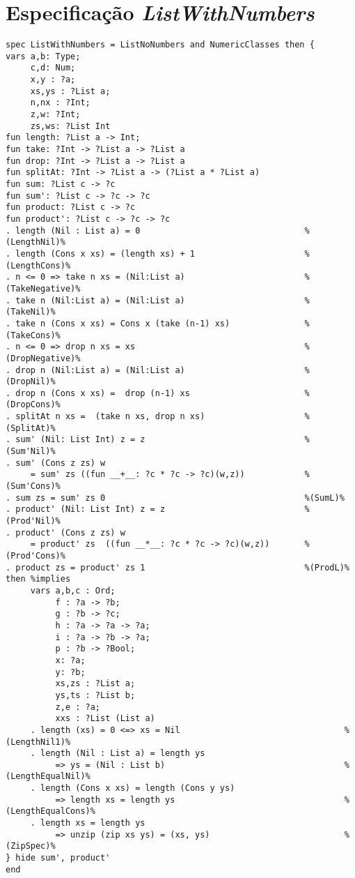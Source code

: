 \section{Especificação \textit{ListWithNumbers}}
\label{appendix:lazySpec:listWithNumbers}
\begin{Verbatim}
spec ListWithNumbers = ListNoNumbers and NumericClasses then {
vars a,b: Type;
     c,d: Num;
     x,y : ?a;
     xs,ys : ?List a;
     n,nx : ?Int;
     z,w: ?Int;
     zs,ws: ?List Int
fun length: ?List a -> Int;
fun take: ?Int -> ?List a -> ?List a
fun drop: ?Int -> ?List a -> ?List a
fun splitAt: ?Int -> ?List a -> (?List a * ?List a)
fun sum: ?List c -> ?c
fun sum': ?List c -> ?c -> ?c
fun product: ?List c -> ?c
fun product': ?List c -> ?c -> ?c
. length (Nil : List a) = 0                                 %(LengthNil)%
. length (Cons x xs) = (length xs) + 1                      %(LengthCons)%
. n <= 0 => take n xs = (Nil:List a)                        %(TakeNegative)%
. take n (Nil:List a) = (Nil:List a)                        %(TakeNil)%
. take n (Cons x xs) = Cons x (take (n-1) xs)               %(TakeCons)%
. n <= 0 => drop n xs = xs                                  %(DropNegative)%
. drop n (Nil:List a) = (Nil:List a)                        %(DropNil)%
. drop n (Cons x xs) =  drop (n-1) xs                       %(DropCons)%
. splitAt n xs =  (take n xs, drop n xs)                    %(SplitAt)%
. sum' (Nil: List Int) z = z                                %(Sum'Nil)%
. sum' (Cons z zs) w
     = sum' zs ((fun __+__: ?c * ?c -> ?c)(w,z))            %(Sum'Cons)%
. sum zs = sum' zs 0                                        %(SumL)%
. product' (Nil: List Int) z = z                            %(Prod'Nil)%
. product' (Cons z zs) w
     = product' zs  ((fun __*__: ?c * ?c -> ?c)(w,z))       %(Prod'Cons)%
. product zs = product' zs 1                                %(ProdL)%
then %implies
     vars a,b,c : Ord;
          f : ?a -> ?b;
          g : ?b -> ?c;
          h : ?a -> ?a -> ?a;
          i : ?a -> ?b -> ?a;
          p : ?b -> ?Bool;
          x: ?a;
          y: ?b;
          xs,zs : ?List a;
          ys,ts : ?List b;
          z,e : ?a;
          xxs : ?List (List a)
     . length (xs) = 0 <=> xs = Nil                                 %(LengthNil1)%  
     . length (Nil : List a) = length ys
          => ys = (Nil : List b)                                    %(LengthEqualNil)%
     . length (Cons x xs) = length (Cons y ys)
          => length xs = length ys                                  %(LengthEqualCons)%
     . length xs = length ys
          => unzip (zip xs ys) = (xs, ys)                           %(ZipSpec)%
} hide sum', product'
end
\end{Verbatim}

